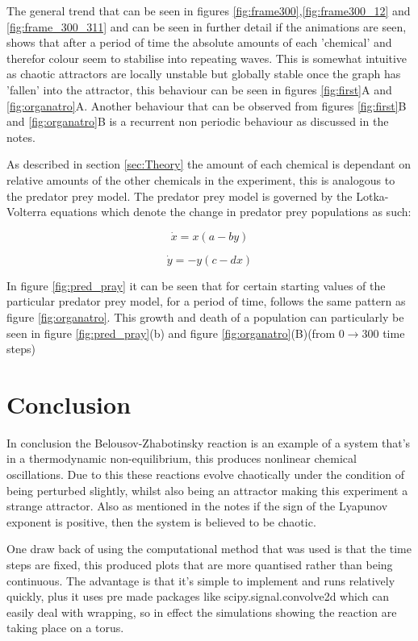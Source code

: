 \documentclass[12pt, A4]{article}
\begin{document}
The general trend that can be seen in figures \ref{fig:frame300},\ref{fig:frame300_12} and \ref{fig:frame_300_311}
and can be seen in further detail if the animations are seen, shows that after a period of time 
the absolute amounts of each 'chemical' and therefor colour seem to stabilise into repeating waves. 
This is somewhat intuitive as chaotic attractors are locally unstable but globally stable 
once the graph has 'fallen' into the attractor, this behaviour can be seen in figures 
\ref{fig:first}A and \ref{fig:organatro}A. Another behaviour that can be observed from figures 
\ref{fig:first}B and \ref{fig:organatro}B is a recurrent non periodic behaviour as discussed in the notes.

As described in section \ref{sec:Theory} the amount of each chemical is dependant on relative 
amounts of the other chemicals in the experiment, this is analogous to the predator prey model.
The predator prey model is governed by the Lotka-Volterra equations which denote the change in 
predator prey populations as such\cite{kinoshita2013pattern}:

\begin{equation}
  \dot{x}=x(a-by)
  \label{eq:LV1}
\end{equation}

\begin{equation}
  \dot{y}=-y(c-dx)
  \label{eq:LV2}
\end{equation}

In figure \ref{fig:pred_pray} it can be seen that for certain starting values of the particular 
predator prey model, for a period of time, follows the same pattern as figure \ref{fig:organatro}.
This growth and death of a population can particularly be seen in figure \ref{fig:pred_pray}(b) and 
figure \ref{fig:organatro}(B)(from $0\rightarrow 300$ time steps)

\section{Conclusion} %
\label{sec:Conclusion}

In conclusion the Belousov-Zhabotinsky reaction is an example of a system that's in a thermodynamic 
non-equilibrium, this produces nonlinear chemical oscillations. Due to this these reactions 
evolve chaotically under the condition of being perturbed slightly, whilst also 
being an attractor making this experiment a strange attractor. Also as mentioned in the notes 
if the sign of the Lyapunov exponent is positive, then the system is believed to be chaotic.

One draw back of using the computational method that was used is that the time steps 
are fixed, this produced plots that are more quantised rather than being continuous. 
The advantage is that it's simple to implement and runs relatively quickly, plus it 
uses pre made packages like scipy.signal.convolve2d which can easily deal with wrapping, so in 
effect the simulations showing the reaction are taking place on a torus.



\end{document}
